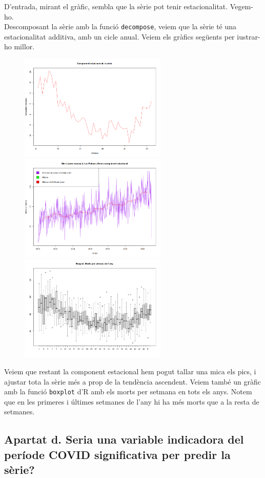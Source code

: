 \documentclass[a4paper, 11pt]{article}
\begin{document}
D'entrada, mirant el gràfic, sembla que la sèrie pot tenir estacionalitat. Vegem-ho.\\
Descomposant la sèrie amb la funció \texttt{decompose}, veiem que la sèrie té una estacionalitat additiva, amb un cicle
anual. Veiem els gràfics següents per i\lgem{}ustrar-ho millor.

\begin{figure}[H]
  \centering
  \includegraphics[width=7cm]{assets/comp-estacional.png}
  \includegraphics[width=7cm]{assets/serie-sens-estacional.png}
  \includegraphics[width=7cm]{assets/boxplot.png}
\end{figure}

Veiem que restant la component estacional hem pogut tallar una mica els pics, i ajustar tota la sèrie més a prop de la
tendència ascendent. Veiem també un gràfic amb la funció \texttt{boxplot} d'R amb els morts per setmana en tots els
anys. Notem que en les primeres i últimes setmanes de l'any hi ha més morts que a la resta de setmanes.

\subsection*{Apartat d. Seria una variable indicadora del període COVID significativa per predir la sèrie?}
\end{document}
